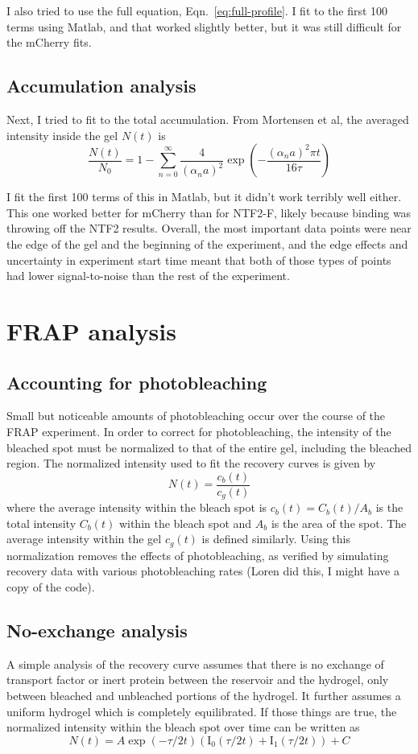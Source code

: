 I also tried to use the full equation, Eqn.~\ref{eq:full-profile}.  I fit to the first 100 terms using Matlab, and that worked slightly better, but it was still difficult for the mCherry fits.
\subsection{Accumulation analysis}
Next, I tried to fit to the total accumulation.  From Mortensen et al, the averaged intensity inside the gel $N(t)$ is
\begin{equation}
\frac{N(t)}{N_0} = 1-\sum_{n=0}^\infty \frac{4}{(\alpha_na)^2}\exp\left(-\frac{(\alpha_na)^2\pi t}{16\tau}\right)
\label{eq:full-accumulation}
\end{equation}

I fit the first 100 terms of this in Matlab, but it didn't work terribly well either.  This one worked better for mCherry than for NTF2-F, likely because binding was throwing off the NTF2 results.  Overall, the most important data points were near the edge of the gel and the beginning of the experiment, and the edge effects and uncertainty in experiment start time meant that both of those types of points had lower signal-to-noise than the rest of the experiment.

\section{FRAP analysis}
\subsection{Accounting for photobleaching}
Small but noticeable amounts of photobleaching occur over the course of the FRAP experiment.  In order to correct for photobleaching, the intensity of the bleached spot must be normalized to that of the entire gel, including the bleached region.  The normalized intensity used to fit the recovery curves is given by
\begin{equation}
N(t) = \frac{c_b(t)}{c_g(t)}
\end{equation} where the average intensity within the bleach spot is $c_b(t) = C_b(t)/A_b$ is the total intensity $C_b(t)$ within the bleach spot and $A_b$ is the area of the spot.  The average intensity within the gel $c_g(t)$ is defined similarly.  Using this normalization removes the effects of photobleaching, as verified by simulating recovery data with various photobleaching rates (Loren did this, I might have a copy of the code).
\subsection{No-exchange analysis}
A simple analysis of the recovery curve assumes that there is no exchange of transport factor or inert protein between the reservoir and the hydrogel, only between bleached and unbleached portions of the hydrogel.  It further assumes a uniform hydrogel which is completely equilibrated.  If those things are true, the normalized intensity within the bleach spot over time can be written as
\begin{equation}
N(t) = A\exp(-\tau/2t)\left(\mathrm{I}_0(\tau/2t)+\mathrm{I}_1(\tau/2t)\right)+C
\end{equation}

